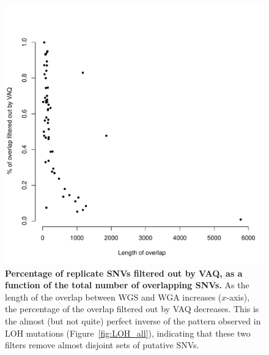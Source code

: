 \documentclass[11pt]{article} %
\begin{document}
\begin{figure}
\centerline{
\includegraphics[width=5in]{./LOH_VAQ/VAQ_all.pdf} }
\caption{ \textbf{Percentage of replicate SNVs filtered out by VAQ, as a function of the total number of overlapping SNVs.} As the length of the overlap between WGS and WGA increases ($x$-axis), the percentage of the overlap filtered out by VAQ decreases. This is the almost (but not quite) perfect inverse of the pattern observed in LOH mutations (Figure~\ref{fig:LOH_all}), indicating that these two filters remove almost disjoint sets of putative SNVs.}
\label{fig:VAQ_all}
\end{figure}
\end{document}
